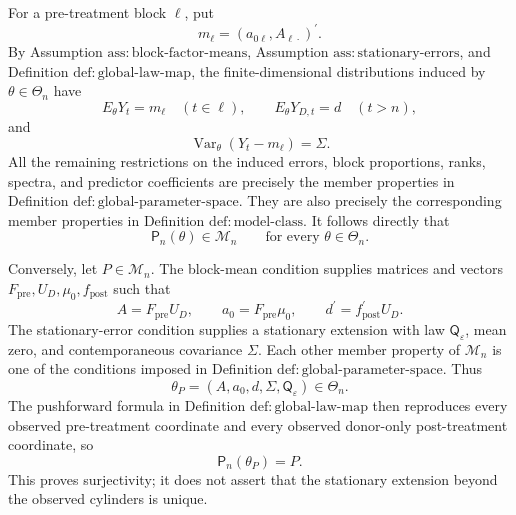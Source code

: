 For a pre-treatment block \(\ell\), put
\[
m_\ell=(a_{0\ell},A_{\ell\cdot})^{\prime}.
\]
By Assumption \(\mathrm{ass:block\mbox{-}factor\mbox{-}means}\), Assumption \(\mathrm{ass:stationary\mbox{-}errors}\), and Definition \(\mathrm{def:global\mbox{-}law\mbox{-}map}\), the finite-dimensional distributions induced by \(\theta\in\Theta_n\) have
\[
E_\theta Y_t=m_\ell\quad(t\in\ell),\qquad
E_\theta Y_{D,t}=d\quad(t>n),
\]
and
\[
\operatorname{Var}_\theta(Y_t-m_\ell)=\Sigma.
\]
All the remaining restrictions on the induced errors, block proportions, ranks, spectra, and predictor coefficients are precisely the member properties in Definition \(\mathrm{def:global\mbox{-}parameter\mbox{-}space}\).  They are also precisely the corresponding member properties in Definition \(\mathrm{def:model\mbox{-}class}\).  It follows directly that
\[
\mathsf P_n(\theta)\in\mathcal M_n
\qquad\text{for every }\theta\in\Theta_n.
\]

Conversely, let \(P\in\mathcal M_n\).  The block-mean condition supplies matrices and vectors \(F_{\mathrm{pre}},U_D,\mu_0,f_{\mathrm{post}}\) such that
\[
A=F_{\mathrm{pre}}U_D,\qquad
a_0=F_{\mathrm{pre}}\mu_0,\qquad
d^{\prime}=f_{\mathrm{post}}^{\prime}U_D.
\]
The stationary-error condition supplies a stationary extension with law \(\mathsf Q_\varepsilon\), mean zero, and contemporaneous covariance \(\Sigma\).  Each other member property of \(\mathcal M_n\) is one of the conditions imposed in Definition \(\mathrm{def:global\mbox{-}parameter\mbox{-}space}\).  Thus
\[
\theta_P=(A,a_0,d,\Sigma,\mathsf Q_\varepsilon)\in\Theta_n.
\]
The pushforward formula in Definition \(\mathrm{def:global\mbox{-}law\mbox{-}map}\) then reproduces every observed pre-treatment coordinate and every observed donor-only post-treatment coordinate, so
\[
\mathsf P_n(\theta_P)=P.
\]
This proves surjectivity; it does not assert that the stationary extension beyond the observed cylinders is unique.


